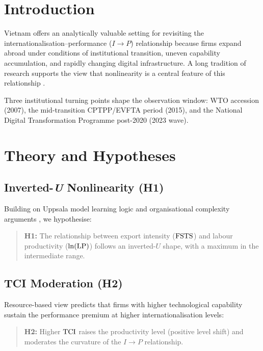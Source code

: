 \documentclass[12pt,a4paper]{article}
\begin{document}
\section{Introduction}
\label{sec:intro}

Vietnam offers an analytically valuable setting for revisiting the
internationalisation--performance (\(I \to P\)) relationship because firms
expand abroad under conditions of institutional transition, uneven capability
accumulation, and rapidly changing digital infrastructure.  A long tradition of
research supports the view that nonlinearity is a central feature of this
relationship \parencite{Lu2004, Hennart2007, Marano2016}.

Three institutional turning points shape the observation window: WTO accession
(2007), the mid-transition CPTPP/EVFTA period (2015), and the National Digital
Transformation Programme post-2020 (2023 wave).

\section{Theory and Hypotheses}
\label{sec:theory}

\subsection{Inverted-\textit{U} Nonlinearity (H1)}

Building on Uppsala model learning logic \parencite{Johanson1977,Johanson2009}
and organisational complexity arguments \parencite{Lu2004}, we hypothesise:

\begin{quote}
\textbf{H1:} The relationship between export intensity (\({\mathrm{FSTS}}\)) and labour
productivity (\({\ln(\mathrm{LP})}\)) follows an inverted-\(U\) shape, with a maximum in the
intermediate range.
\end{quote}

\subsection{TCI Moderation (H2)}

Resource-based view \parencite{Barney1991} predicts that firms with higher
technological capability sustain the performance premium at higher
internationalisation levels:

\begin{quote}
\textbf{H2:} Higher \({\mathrm{TCI}}\) raises the productivity level (positive level
shift) and moderates the curvature of the \(I \to P\) relationship.
\end{quote}
\end{document}
